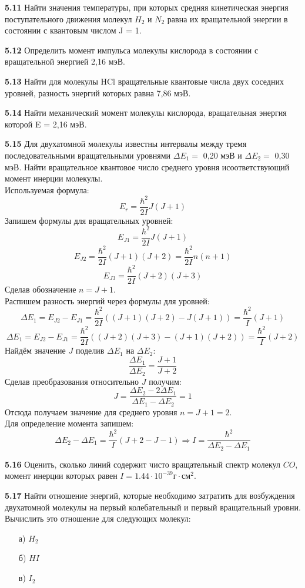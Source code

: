 	\textbf{5.11 }
		Найти значения температуры, при которых средняя кинетическая энергия
		поступательного движения молекул \( H_2 \) и \( N_2 \) равна их 
		вращательной энергии в состоянии с квантовым числом J = 1.

	\textbf{5.12 }
		Определить момент импульса молекулы кислорода в состоянии с
		вращательной энергией 2,16 мэВ.

	\textbf{5.13 }
		Найти для молекулы HCl вращательные квантовые числа двух соседних
		уровней, разность энергий которых равна 7,86 мэВ.

	\textbf{5.14 }
		Найти механический момент молекулы кислорода, вращательная энергия
		которой E = 2,16 мэВ.

	\textbf{5.15 }
		Для двухатомной молекулы известны интервалы между тремя
		последовательными вращательными уровнями \( \Delta E_1 = \) 0,20 мэВ и
		\(\Delta E_2 = \) 0,30 мэВ. Найти вращательное квантовое число 
		среднего уровня исоответствующий момент инерции молекулы. \\
		Используемая формула: \[ E_r = \frac{\hbar^2}{2I}J(J+1) \]
		Запишем формулы для вращательных уровней:
		\[ E_{J1} = \frac{\hbar^2}{2I}J(J+1) \]
		\[ E_{J2} = \frac{\hbar^2}{2I}(J+1)(J+2) = \frac{\hbar^2}{2I}n(n+1) \]
		\[ E_{J3} = \frac{\hbar^2}{2I}(J+2)(J+3) \]
		Сделав обозначение \( n = J + 1 \). \\
		Распишем разность энергий через формулы для уровней:
		\[ 
			\Delta E_1 = E_{J2} - E_{J1} = 
			\frac{\hbar^2}{2I}((J+1)(J+2) - J(J+1)) = \frac{\hbar^2}{I}(J+1) 
		\]
		\[ 
			\Delta E_1 = E_{J2} - E_{J1} =
			\frac{\hbar^2}{2I}((J+2)(J+3)-(J+1)(J+2)) = \frac{\hbar^2}{I}(J+2)
		\]
		Найдём значение \( J \) поделив \( \Delta E_1 \) на \( \Delta E_2 \):
		\[ \frac{\Delta E_1}{\Delta E_2} = \frac{J+1}{J+2} \]
		Сделав преобразования относительно \( J \) получим:
		\[ J = \frac{\Delta E_2 - 2\Delta E_1}{\Delta E_1 - \Delta E_2} = 1 \]
		Отсюда получаем значение для среднего уровня \( n = J+1 = 2 \). \\
		Для определение момента запишем: 
		\[ 
			\Delta E_2 - \Delta E_1 = \frac{\hbar^2}{I}(J+2-J-1) 
			\Rightarrow I = \frac{\hbar^2}{\Delta E_2 - \Delta E_1}
		\]

	\textbf{5.16 }
		Оценить, сколько линий содержит чисто вращательный спектр молекул
		\( CO \), момент инерции которых равен 
		\( I = 1.44\cdot10^{-39} \text{г}\cdot\text{см}^2 \).

	\textbf{5.17 }
		Найти отношение энергий, которые необходимо затратить для
		возбуждения двухатомной молекулы на первый колебательный и первый
		вращательный уровни. Вычислить это отношение для следующих молекул:
		\vspace*{-1em} 
		\begin{itemize}\itemsep-8pt
			\item[а)] \( H_2 \)
			\item[б)] \( HI \)
			\item[в)] \( I_2 \)
		\end{itemize}
